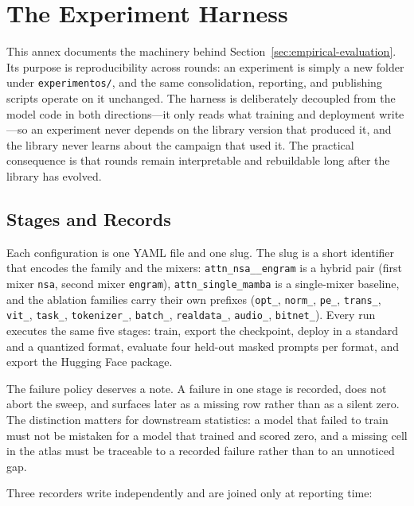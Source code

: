 \section{The Experiment Harness}
\label{sec:annex-experiment-harness}

This annex documents the machinery behind Section~\ref{sec:empirical-evaluation}. Its purpose is reproducibility across rounds: an experiment is simply a new folder under \texttt{experimentos/}, and the same consolidation, reporting, and publishing scripts operate on it unchanged. The harness is deliberately decoupled from the model code in both directions---it only reads what training and deployment write---so an experiment never depends on the library version that produced it, and the library never learns about the campaign that used it. The practical consequence is that rounds remain interpretable and rebuildable long after the library has evolved.

\subsection{Stages and Records}

Each configuration is one YAML file and one slug. The slug is a short identifier that encodes the family and the mixers: \texttt{attn\_nsa\_\_engram} is a hybrid pair (first mixer \texttt{nsa}, second mixer \texttt{engram}), \texttt{attn\_single\_mamba} is a single-mixer baseline, and the ablation families carry their own prefixes (\texttt{opt\_}, \texttt{norm\_}, \texttt{pe\_}, \texttt{trans\_}, \texttt{vit\_}, \texttt{task\_}, \texttt{tokenizer\_}, \texttt{batch\_}, \texttt{realdata\_}, \texttt{audio\_}, \texttt{bitnet\_}). Every run executes the same five stages: train, export the checkpoint, deploy in a standard and a quantized format, evaluate four held-out masked prompts per format, and export the Hugging Face package.

The failure policy deserves a note. A failure in one stage is recorded, does not abort the sweep, and surfaces later as a missing row rather than as a silent zero. The distinction matters for downstream statistics: a model that failed to train must not be mistaken for a model that trained and scored zero, and a missing cell in the atlas must be traceable to a recorded failure rather than to an unnoticed gap.

Three recorders write independently and are joined only at reporting time:

